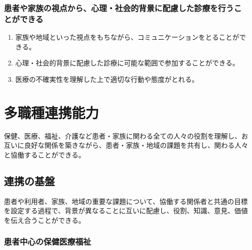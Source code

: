 \hypertarget{ux60a3ux8005ux3084ux5bb6ux65cfux306eux8996ux70b9ux304bux3089ux5fc3ux7406ux793eux4f1aux7684ux80ccux666fux306bux914dux616eux3057ux305fux8a3aux7642ux3092ux884cux3046ux3053ux3068ux304cux3067ux304dux308b}{%
\subsubsection{患者や家族の視点から、心理・社会的背景に配慮した診療を行うことができる}\label{ux60a3ux8005ux3084ux5bb6ux65cfux306eux8996ux70b9ux304bux3089ux5fc3ux7406ux793eux4f1aux7684ux80ccux666fux306bux914dux616eux3057ux305fux8a3aux7642ux3092ux884cux3046ux3053ux3068ux304cux3067ux304dux308b}}

\begin{enumerate}
\def\labelenumi{\arabic{enumi}.}
\tightlist
\item
  家族や地域といった視点をもちながら、コミュニケーションをとることができる。
\item
  心理・社会的背景に配慮した診療に可能な範囲で参加することができる。
\item
  医療の不確実性を理解した上で適切な行動や態度がとれる。
\end{enumerate}

\newpage

\hypertarget{ux591aux8077ux7a2eux9023ux643aux80fdux529b}{%
\section{多職種連携能力}\label{ux591aux8077ux7a2eux9023ux643aux80fdux529b}}

保健、医療、福祉、介護など患者・家族に関わる全ての人々の役割を理解し、お互いに良好な関係を築きながら、患者・家族・地域の課題を共有し、関わる人々と協働することができる。

\hypertarget{ux9023ux643aux306eux57faux76e4}{%
\subsection{連携の基盤}\label{ux9023ux643aux306eux57faux76e4}}

患者や利用者、家族、地域の重要な課題について、協働する関係者と共通の目標を設定する過程で、背景が異なることに互いに配慮し、役割、知識、意見、価値を伝え合うことができる。

\hypertarget{ux60a3ux8005ux4e2dux5fc3ux306eux4fddux5065ux533bux7642ux798fux7949}{%
\subsubsection{患者中心の保健医療福祉}\label{ux60a3ux8005ux4e2dux5fc3ux306eux4fddux5065ux533bux7642ux798fux7949}}


